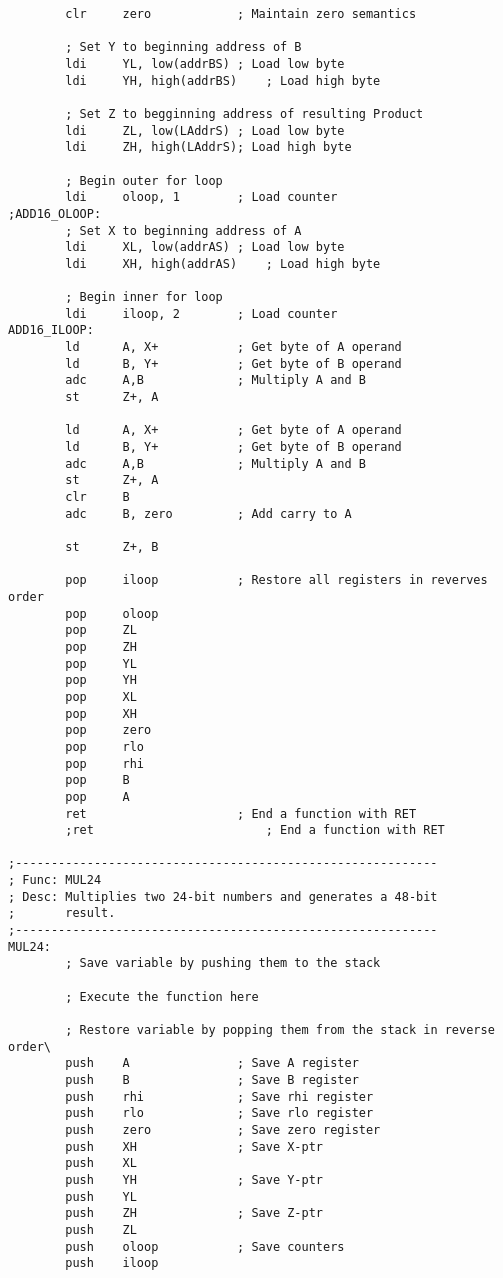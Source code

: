 \documentclass[12pt,letterpaper]{article}
\begin{document}
\begin{verbatim}
        clr     zero            ; Maintain zero semantics

        ; Set Y to beginning address of B
        ldi     YL, low(addrBS) ; Load low byte
        ldi     YH, high(addrBS)    ; Load high byte

        ; Set Z to begginning address of resulting Product
        ldi     ZL, low(LAddrS) ; Load low byte
        ldi     ZH, high(LAddrS); Load high byte

        ; Begin outer for loop
        ldi     oloop, 1        ; Load counter
;ADD16_OLOOP:
        ; Set X to beginning address of A
        ldi     XL, low(addrAS) ; Load low byte
        ldi     XH, high(addrAS)    ; Load high byte

        ; Begin inner for loop
        ldi     iloop, 2        ; Load counter
ADD16_ILOOP:
        ld      A, X+           ; Get byte of A operand
        ld      B, Y+           ; Get byte of B operand
        adc     A,B             ; Multiply A and B
        st      Z+, A

        ld      A, X+           ; Get byte of A operand
        ld      B, Y+           ; Get byte of B operand
        adc     A,B             ; Multiply A and B
        st      Z+, A
        clr     B
        adc     B, zero         ; Add carry to A

        st      Z+, B

        pop     iloop           ; Restore all registers in reverves order
        pop     oloop
        pop     ZL
        pop     ZH
        pop     YL
        pop     YH
        pop     XL
        pop     XH
        pop     zero
        pop     rlo
        pop     rhi
        pop     B
        pop     A
        ret                     ; End a function with RET
        ;ret                        ; End a function with RET

;-----------------------------------------------------------
; Func: MUL24
; Desc: Multiplies two 24-bit numbers and generates a 48-bit
;       result.
;-----------------------------------------------------------
MUL24:
        ; Save variable by pushing them to the stack

        ; Execute the function here

        ; Restore variable by popping them from the stack in reverse order\
        push    A               ; Save A register
        push    B               ; Save B register
        push    rhi             ; Save rhi register
        push    rlo             ; Save rlo register
        push    zero            ; Save zero register
        push    XH              ; Save X-ptr
        push    XL
        push    YH              ; Save Y-ptr
        push    YL
        push    ZH              ; Save Z-ptr
        push    ZL
        push    oloop           ; Save counters
        push    iloop


\end{verbatim}
\end{document}
